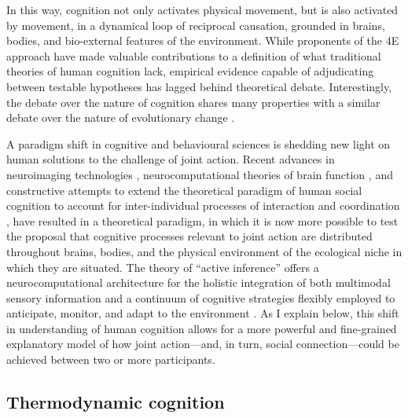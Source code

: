 \begin{CJK}{UTF8}{gbsn}
In this way, cognition not only activates physical movement, but is also activated by movement, in a dynamical loop of reciprocal causation, grounded in brains, bodies, and bio-external features of the environment.  While proponents of the 4E approach have made valuable contributions to a definition of what traditional theories of human cognition lack, empirical evidence capable of adjudicating between testable hypotheses has lagged behind theoretical debate.  Interestingly, the debate over the nature of cognition shares many properties with a similar debate over the nature of evolutionary change \citep[discussed in more detail in the General Discussion of this dissertation, see][]{Nowak2010,Scott-Phillips2011,Laland2014,Fuentes2016}.

A paradigm shift in cognitive and behavioural sciences is shedding new light on human solutions to the challenge of joint action.  Recent advances in neuroimaging technologies \citep{Frith2007}, neurocomputational theories of brain function \citep{Friston2010,Frith2010,Yufik2013,Clark2013}, and constructive attempts to extend the theoretical paradigm of human social cognition to account for inter-individual processes of interaction and coordination \citep{Sebanz2006,Dale2014}, have resulted in a theoretical paradigm, in which it is now more possible to test the proposal that cognitive processes relevant to joint action are distributed throughout brains, bodies, and the physical environment of the ecological niche in which they are situated.  The theory of ``active inference'' \citep{Friston2010} offers a neurocomputational architecture for the holistic integration of both multimodal sensory information and a continuum of cognitive strategies flexibly employed to anticipate, monitor, and adapt to the environment \citep{Clark2015}.  As I explain below, this shift in understanding of human cognition allows for a more powerful and fine-grained explanatory model of how joint action---and, in turn, social connection---could be achieved between two or more participants.


\subsection{Thermodynamic cognition\label{sect:thermoCog}}


\end{CJK}
